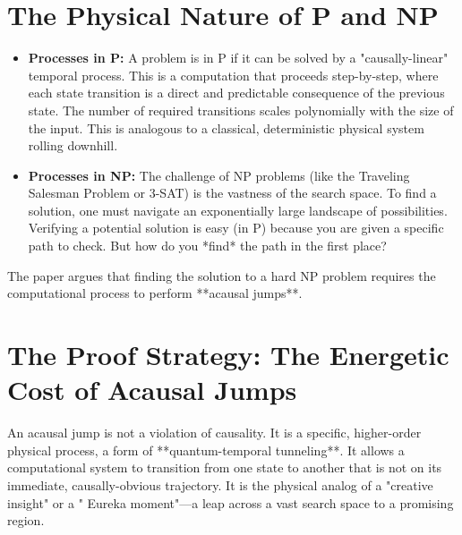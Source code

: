 \documentclass[12pt]{report}
\begin{document}
\section{The Physical Nature of P and NP}
\begin{itemize}
    \item \textbf{Processes in P:} A problem is in P if it can be solved by a "causally-linear" temporal process. This is a computation that proceeds step-by-step, where each state transition is a direct and predictable consequence of the previous state. The number of required transitions scales polynomially with the size of the input. This is analogous to a classical, deterministic physical system rolling downhill.
    \item \textbf{Processes in NP:} The challenge of NP problems (like the Traveling Salesman Problem or 3-SAT) is the vastness of the search space. To find a solution, one must navigate an exponentially large landscape of possibilities. Verifying a potential solution is easy (in P) because you are given a specific path to check. But how do you *find* the path in the first place?
\end{itemize}
The paper argues that finding the solution to a hard NP problem requires the computational process to perform **acausal jumps**.

\section{The Proof Strategy: The Energetic Cost of Acausal Jumps}
An acausal jump is not a violation of causality. It is a specific, higher-order physical process, a form of **quantum-temporal tunneling**. It allows a computational system to transition from one state to another that is not on its immediate, causally-obvious trajectory. It is the physical analog of a "creative insight" or a " Eureka moment"—a leap across a vast search space to a promising region.
\end{document}
